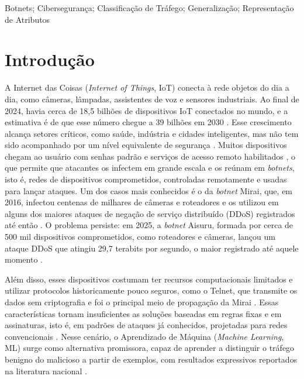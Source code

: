 \documentclass[alpha-refs,brazilian]{CC-EC_TF-TC}
\begin{document}
\begin{frontmatter}
\begin{palavras_chave}
Botnets; Cibersegurança; Classificação de Tráfego; Generalização; Representação de Atributos
\end{palavras_chave}

\end{frontmatter}
\clearpage



\section{Introdução}
\label{sec:introducao}

A Internet das Coisas (\textit{Internet of Things}, IoT) conecta à rede objetos do dia a dia, como câmeras, lâmpadas, assistentes de voz e sensores industriais. Ao final de 2024, havia cerca de 18,5 bilhões de dispositivos IoT conectados no mundo, e a estimativa é de que esse número chegue a 39 bilhões em 2030 \citep{iotanalytics2025}. Esse crescimento alcança setores críticos, como saúde, indústria e cidades inteligentes, mas não tem sido acompanhado por um nível equivalente de segurança \citep{alfahaid2025survey}. Muitos dispositivos chegam ao usuário com senhas padrão e serviços de acesso remoto habilitados \citep{owasp2018iot}, o que permite que atacantes os infectem em grande escala e os reúnam em \textit{botnets}, isto é, redes de dispositivos comprometidos, controladas remotamente e usadas para lançar ataques. Um dos casos mais conhecidos é o da \textit{botnet} Mirai, que, em 2016, infectou centenas de milhares de câmeras e roteadores e os utilizou em alguns dos maiores ataques de negação de serviço distribuído (DDoS) registrados até então \citep{kolias2017ddos}. O problema persiste: em 2025, a \textit{botnet} Aisuru, formada por cerca de 500 mil dispositivos comprometidos, como roteadores e câmeras, lançou um ataque DDoS que atingiu 29,7 terabits por segundo, o maior registrado até aquele momento \citep{cloudflare2025aisuru}.

Além disso, esses dispositivos costumam ter recursos computacionais limitados e utilizar protocolos historicamente pouco seguros, como o Telnet, que transmite os dados sem criptografia e foi o principal meio de propagação da Mirai \citep{kolias2017ddos}. Essas características tornam insuficientes as soluções baseadas em regras fixas e em assinaturas, isto é, em padrões de ataques já conhecidos, projetadas para redes convencionais \citep{alfahaid2025survey}. Nesse cenário, o Aprendizado de Máquina (\textit{Machine Learning}, ML) surge como alternativa promissora, capaz de aprender a distinguir o tráfego benigno do malicioso a partir de exemplos, com resultados expressivos reportados na literatura nacional \citep{bochie2020deteccao,souza2024avaliacao}.
\end{document}
